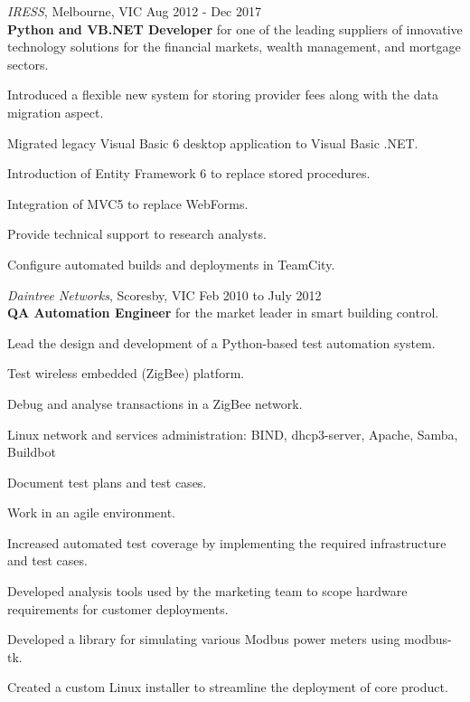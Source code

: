 \documentclass[line,margin]{res}
\begin{document}
\begin{resume}
        \textit{IRESS}, Melbourne, VIC \hfill Aug 2012 - Dec 2017 \\
        \textbf{Python and VB.NET Developer} for one of the leading suppliers of innovative technology
        solutions for the financial markets, wealth management, and mortgage sectors.
        \begin{list}{}{\leftmargin=1em \itemsep=-2pt}
            \item{Introduced a flexible new system for storing provider fees along with the data migration aspect.}
            \item{Migrated legacy Visual Basic 6 desktop application to Visual Basic .NET.}
            \item{Introduction of Entity Framework 6 to replace stored procedures.}
            \item{Integration of MVC5 to replace WebForms.}
            \item{Provide technical support to research analysts.}
            \item{Configure automated builds and deployments in TeamCity.}
        \end{list}

        \textit{Daintree Networks}, Scoresby, VIC \hfill Feb 2010 to July 2012 \\
        \textbf{QA Automation Engineer} for the market leader in smart building control.
        \begin{list}{}{\leftmargin=1em \itemsep=-2pt}
            \item{Lead the design and development of a Python-based test automation system.}
            \item{Test wireless embedded (ZigBee) platform.}
            \item{Debug and analyse transactions in a ZigBee network.}
            \item{Linux network and services administration: BIND, dhcp3-server, Apache, Samba, Buildbot}
            \item{Document test plans and test cases.}
            \item{Work in an agile environment.}
            \item{Increased automated test coverage by implementing the required infrastructure and test cases.}
            \item{Developed analysis tools used by the marketing team to scope hardware requirements for customer deployments.}
            \item{Developed a library for simulating various Modbus power meters using modbus-tk.}
            \item{Created a custom Linux installer to streamline the deployment of core product.}
        \end{list}


\end{resume}
\end{document}
